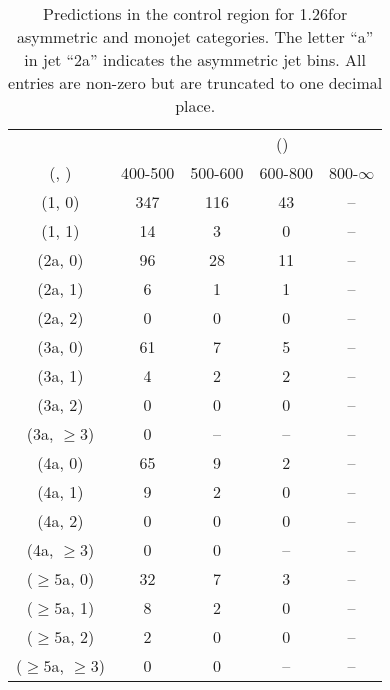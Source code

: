\begin{table}[h!]
\tiny
\centering
\caption{Predictions in the \gj control region for 1.26\ifb for asymmetric and monojet categories. The letter ``a'' in jet \eg ``2a''  indicates the asymmetric jet bins. All entries are non-zero but are truncated to one decimal place.\label{tab:predsep_gj_data_asym}}
\begin{tabular}
{ccccc}
	\hline\hline
&	& \multicolumn{4}{c}{\scalht (\gev)} \\ 
	 (\njet,  \nb) & 400-500 & 500-600 & 600-800 & 800-$\infty$ \\ [0.8ex] 
\hline
	(1, 0) & 347 & 116 & 43 & -- \\[0.5ex] 
	(1, 1) & 14 & 3 & 0 & -- \\[0.5ex] 
	(2a, 0) & 96 & 28 & 11 & -- \\[0.5ex] 
	(2a, 1) & 6 & 1 & 1 & -- \\[0.5ex] 
	(2a, 2) & 0 & 0 & 0 & -- \\[0.5ex] 
	(3a, 0) & 61 & 7 & 5 & -- \\[0.5ex] 
	(3a, 1) & 4 & 2 & 2 & -- \\[0.5ex] 
	(3a, 2) & 0 & 0 & 0 & -- \\[0.5ex] 
	(3a, $\ge3$) & 0 & -- & -- & -- \\[0.5ex] 
	(4a, 0) & 65 & 9 & 2 & -- \\[0.5ex] 
	(4a, 1) & 9 & 2 & 0 & -- \\[0.5ex] 
	(4a, 2) & 0 & 0 & 0 & -- \\[0.5ex] 
	(4a, $\ge3$) & 0 & 0 & -- & -- \\[0.5ex] 
	($\ge5$a, 0) & 32 & 7 & 3 & -- \\[0.5ex] 
	($\ge5$a, 1) & 8 & 2 & 0 & -- \\[0.5ex] 
	($\ge5$a, 2) & 2 & 0 & 0 & -- \\[0.5ex] 
	($\ge5$a, $\ge3$) & 0 & 0 & -- & -- \\[0.5ex] 
	\hline
	\hline
\end{tabular}
\end{table}
